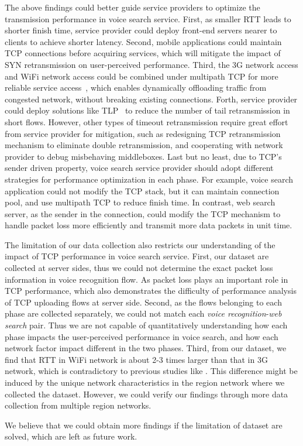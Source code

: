The above findings could better guide service providers to optimize the transmission performance in voice search service. First, as smaller RTT leads to shorter finish time, service provider could deploy front-end servers nearer to clients to achieve shorter latency. Second, mobile applications could maintain TCP connections before acquiring services, which will mitigate the impact of SYN retransmission on user-perceived performance. Third, the 3G network access and WiFi network access could be combined under multipath TCP for more reliable service access~\cite{UM-CS-2012-022}, which enables dynamically offloading traffic from congested network, without breaking existing connections. Forth, service provider could deploy solutions like TLP~\cite{flach2013reducing} to reduce the number of tail retransmission in short flows. However, other types of timeout retransmission require great effort from service provider for mitigation, such as redesigning TCP retransmission mechanism to eliminate double retransmission, and cooperating with network provider to debug misbehaving middleboxes. Last but no least, due to TCP's sender driven property, voice search service provider should adopt different strategies for performance optimization in each phase. For example, voice search application could not modify the TCP stack, but it can maintain connection pool, and use multipath TCP to reduce finish time. In contrast, web search server, as the sender in the connection, could modify the TCP mechanism to handle packet loss more efficiently and transmit more data packets in unit time.

The limitation of our data collection also restricts our understanding of the impact of TCP performance in voice search service. First, our dataset are collected at server sides, thus we could not determine the exact packet loss information in voice recognition flow. As packet loss plays an important role in TCP performance, which also demonstrates the difficulty of performance analysis of TCP uploading flows at server side. Second, as the flows belonging to each phase are collected separately, we could not match each \emph{voice recognition}-\emph{web search} pair. Thus we are not capable of quantitatively understanding how each phase impacts the user-perceived performance in voice search, and how each network factor impact different in the two phases. Third, from our dataset, we find that RTT in WiFi network is about 2-3 times larger than that in 3G network, which is contradictory to previous studies like \cite{sommers2012cell}. This difference might be induced by the unique network characteristics in the region network where we collected the dataset. However, we could verify our findings through more data collection from multiple region networks.

We believe that we could obtain more findings if the limitation of dataset are solved, which are left as future work.